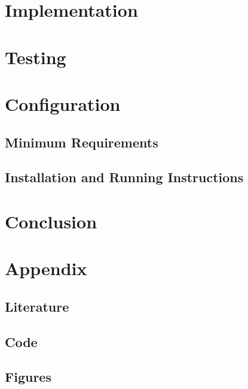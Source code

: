 \documentclass{article}
\begin{document}
\section{Implementation}
\section{Testing}
\section{Configuration}
\subsection{Minimum Requirements}
\subsection{Installation and Running Instructions}
\section{Conclusion}
\section{Appendix}
\subsection{Literature}
\subsection{Code}
\subsection{Figures}
\end{document}
